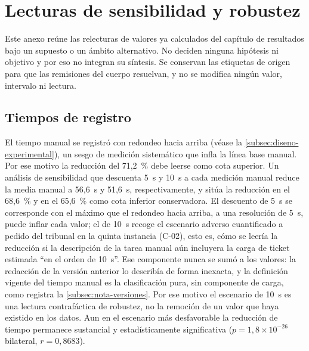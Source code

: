 \clearpage

\section{Lecturas de sensibilidad y robustez}\label{sec:anexo-sensibilidad}

Este anexo reúne las relecturas de valores ya calculados del capítulo de resultados bajo un supuesto o un ámbito alternativo. No deciden ninguna hipótesis ni objetivo y por eso no integran su síntesis. Se conservan las etiquetas de origen para que las remisiones del cuerpo resuelvan, y no se modifica ningún valor, intervalo ni lectura.

\subsection{Tiempos de registro}\label{subsec:anexo-sensibilidad-tiempos}

El tiempo manual se registró con redondeo hacia arriba (véase la \autoref{subsec:diseno-experimental}), un sesgo de medición sistemático que infla la línea base manual. Por ese motivo la reducción del 71,2~\% debe leerse como cota superior. Un análisis de sensibilidad que descuenta 5~s y 10~s a cada medición manual reduce la media manual a 56,6~s y 51,6~s, respectivamente, y sitúa la reducción en el 68,6~\% y en el 65,6~\% como cota inferior conservadora. El descuento de 5~s se corresponde con el máximo que el redondeo hacia arriba, a una resolución de 5~s, puede inflar cada valor; el de 10~s recoge el escenario adverso cuantificado a pedido del tribunal en la quinta instancia (C-02), esto es, cómo se leería la reducción si la descripción de la tarea manual aún incluyera la carga de ticket estimada ``en el orden de 10~s''. Ese componente nunca se sumó a los valores: la redacción de la versión anterior lo describía de forma inexacta, y la definición vigente del tiempo manual es la clasificación pura, sin componente de carga, como registra la \autoref{subsec:nota-versiones}. Por ese motivo el escenario de 10~s es una lectura contrafáctica de robustez, no la remoción de un valor que haya existido en los datos. Aun en el escenario más desfavorable la reducción de tiempo permanece sustancial y estadísticamente significativa (\(p = 1{,}8 \times 10^{-26}\) bilateral, \(r = 0{,}8683\)).

